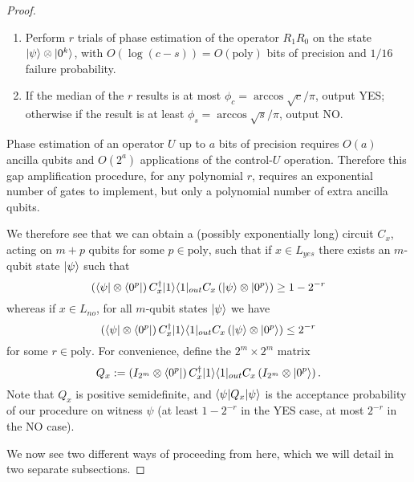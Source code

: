 \documentclass[english]{article}
\numberwithin{equation}{section}
\numberwithin{figure}{section}
\theoremstyle{plain}
\theoremstyle{definition}
\theoremstyle{plain}
\theoremstyle{definition}
\theoremstyle{remark}
\theoremstyle{remark}
\theoremstyle{plain}
\begin{document}
\begin{proof}
\begin{enumerate}
\item Perform $r$ trials of phase estimation of the operator $R_1R_0$ on the state $|\psi\rangle\otimes |0^k\rangle$, with $O(\log(c-s)) = O(\text{poly})$ bits of precision and $1/16$ failure probability. 
\item If the median of the $r$ results is at most $\phi_c = \arccos\sqrt{c}/\pi$, output YES; otherwise if the result is at least $\phi_s = \arccos\sqrt{s}/\pi$, output NO.
\end{enumerate}

Phase estimation of an operator $U$ up to $a$ bits of precision requires $O(a)$ ancilla qubits and $O(2^a)$ applications of the control-$U$ operation. Therefore this gap amplification procedure, for any polynomial $r$, requires an exponential number of gates to implement, but only a polynomial number of extra ancilla qubits.

We therefore see that we can obtain a (possibly exponentially long) circuit $C_x$, acting on $m+p$ qubits for some $p \in \text{poly}$, such that if $x \in L_{yes}$ there exists an $m$-qubit state $|\psi\rangle$ such that
\begin{equation}
\left(\langle \psi|\otimes \langle 0^p|\right) C^\dagger_x |1\rangle\langle 1|_{out} C_x \left(|\psi\rangle\otimes |0^p\rangle\right) \ge 1-2^{-r}
\end{equation}
whereas if $x \in L_{no}$, for all $m$-qubit states $|\psi\rangle$ we have
\begin{equation}
\left(\langle \psi|\otimes \langle 0^p|\right) C^\dagger_x |1\rangle\langle 1|_{out} C_x \left(|\psi\rangle\otimes |0^p\rangle\right) \le 2^{-r}
\end{equation}
for some $r \in \text{poly}$. For convenience, define the $2^m \times 2^m$ matrix
\begin{equation}
Q_x := \left(I_{2^m}\otimes \langle 0^p|\right) C^\dagger_x |1\rangle\langle 1|_{out} C_x \left(I_{2^m}\otimes |0^p\rangle\right).
\end{equation}
Note that $Q_x$ is positive semidefinite, and $\langle \psi|Q_x|\psi\rangle$ is the acceptance probability of our procedure on witness $\psi$ (at least $1-2^{-r}$ in the YES case, at most $2^{-r}$ in the NO case).

We now see two different ways of proceeding from here, which we will detail in two separate subsections.


\end{proof}
\end{document}
